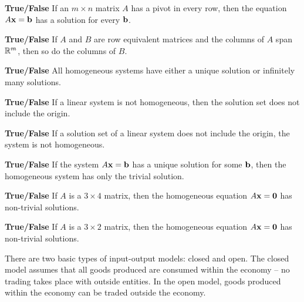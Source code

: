 \item \textbf{True/False} If an $m \times n$ matrix $A$ has a pivot in every row, then the equation $A\mathbf{x}=\mathbf{b}$ has a solution for every $\mathbf{b}$.

\item \textbf{True/False} If $A$ and $B$ are row equivalent matrices and the columns of $A$ span $\mathbb{R}^m$, then so do the columns of $B$.

\item \textbf{True/False} All homogeneous systems have either a unique solution or infinitely many solutions.

\item \textbf{True/False} If a linear system is not homogeneous, then the solution set does not include the origin.

\item \textbf{True/False} If a solution set of a linear system does not include the origin, the system is not homogeneous.

\item \textbf{True/False} If the system $A\mathbf{x}=\mathbf{b}$ has a unique solution for some $\mathbf{b}$, then the homogeneous system has only the trivial solution.

\item \textbf{True/False} If $A$ is a $3\times 4$ matrix, then the homogeneous equation $A\mathbf{x}=\mathbf{0}$ has non-trivial solutions.

\item \textbf{True/False}  If $A$ is a $3\times 2$ matrix, then the homogeneous equation $A\mathbf{x}=\mathbf{0}$ has non-trivial solutions.

\ea
\ee

\label{sec:proj_io_models}

There are two basic types of input-output models: closed and open. The closed model assumes that all goods produced are consumed within the economy -- no trading takes place with outside entities. In the open model, goods produced within the economy can be traded outside the economy.

